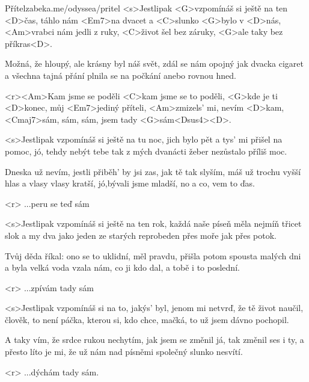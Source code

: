 \begin{song}{51}{Přítel}{zabeka.me/odyssea/pritel}
	<s>Jestlipak <G>vzpomínáš si ještě na ten <D>čas,
	táhlo nám <Em7>na dvacet a <C>slunko <G>bylo v <D>nás,
	<Am>vrabci nám jedli z ruky,
	<C>život šel bez záruky,
	<G>ale taky bez příkras<D>.

	Možná, že hloupý, ale krásny byl náš svět,
	zdál se nám opojný jak dvacka cigaret
	a všechna tajná přání
	plnila se na počkání anebo rovnou hned.

	<r><Am>Kam jsme se poděli
	<C>kam jsme se to poděli,
	<G>kde je ti <D>konec, můj <Em7>jediný příteli,
	<Am>zmizels' mi, nevím <D>kam,
	<Cmaj7>sám, sám, sám, jsem tady <G>sám<Dsus4><D>.

	<s>Jestlipak vzpomínáš si ještě na tu noc,
	jich bylo pět a tys' mi přišel na pomoc,
	jó, tehdy nebýt tebe tak z mých
	dvanácti žeber nezůstalo příliš moc.

	Dneska už nevím, jestli přiběh' by jsi zas,
	jak tě tak slyším, máš už trochu vyšší hlas
	a vlasy vlasy kratší, jó,bývali jsme mladší,
	no a co, vem to ďas.

	<r>
	...peru se teď sám

	<s>Jestlipak vzpomínáš si ještě na ten rok,
	každá naše píseň měla nejmíň třicet slok
	a my dva jako jeden ze starých reprobeden
	přes moře jak přes potok.

	Tvůj děda říkal: ono se to uklidní,
	měl pravdu, přišla potom spousta malých dni
	a byla velká voda vzala nám, co ji kdo dal,
	a tobě i to poslední.

	<r>
	...zpívám tady sám

	<s>Jestlipak vzpomínáš si na to, jakýs' byl,
	jenom mi netvrď, že tě život naučil,
	člověk, to není páčka,
	kterou si, kdo chce, mačká,
	to už jsem dávno pochopil.

	A taky vím, že srdce rukou nechytím,
	jak jsem se změnil já, tak změnil ses i ty,
	a přesto líto je mi, že už nám nad písněmi
	společný slunko nesvítí.

	<r>
	...dýchám tady sám.

\end{song}
